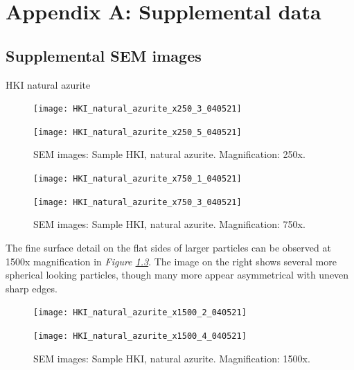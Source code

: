 \chapter{Appendix A: Supplemental data} 



\section{Supplemental SEM images}

HKI natural azurite

\begin{figure}[H]
\centering
\begin{minipage}{.45\textwidth}
  \centering
  \texttt{[image: HKI\_natural\_azurite\_x250\_3\_040521]}
\end{minipage}
\begin{minipage}{.45\textwidth}
  \centering
  \texttt{[image: HKI\_natural\_azurite\_x250\_5\_040521]}
\end{minipage}
\caption[SEM images: Sample HKI, natural azurite]{SEM images: Sample HKI, natural azurite. Magnification: 250x.}
\label{fig:hki_nat_az_sem_1}
\end{figure}


\begin{figure}[H]
\centering
\begin{minipage}{.45\textwidth}
  \centering
  \texttt{[image: HKI\_natural\_azurite\_x750\_1\_040521]}
\end{minipage}
\begin{minipage}{.45\textwidth}
  \centering
  \texttt{[image: HKI\_natural\_azurite\_x750\_3\_040521]}
\end{minipage}
\caption[SEM images: Sample HKI, natural azurite]{SEM images: Sample HKI, natural azurite. Magnification: 750x.}
\label{fig:hki_nat_az_sem_2}
\end{figure}

The fine surface detail on the flat sides of larger particles can be observed at 1500x magnification in \textit{Figure \ref{fig:hki_nat_az_sem_3}}. The image on the right shows several more spherical looking particles, though many more appear asymmetrical with uneven sharp edges. 

\begin{figure}[H]
\centering
\begin{minipage}{.45\textwidth}
  \centering
  \texttt{[image: HKI\_natural\_azurite\_x1500\_2\_040521]}
\end{minipage}
\begin{minipage}{.45\textwidth}
  \centering
  \texttt{[image: HKI\_natural\_azurite\_x1500\_4\_040521]}
\end{minipage}
\caption[SEM images: Sample HKI, natural azurite]{SEM images: Sample HKI, natural azurite. Magnification: 1500x.}
\label{fig:hki_nat_az_sem_3}
\end{figure}

